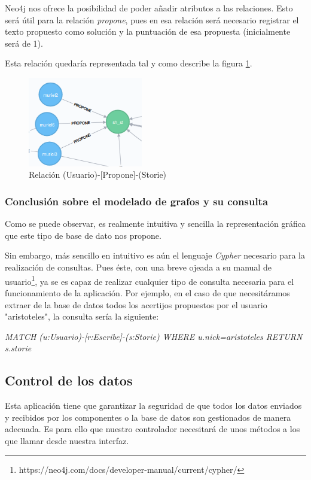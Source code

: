 Neo4j nos ofrece la posibilidad de poder añadir atributos a las relaciones. Esto será útil para la relación \textit{propone}, pues en esa relación será necesario registrar el texto propuesto como solución y la puntuación de esa propuesta (inicialmente será de 1).

Esta relación quedaría representada tal y como describe la figura \ref{fig::propone}.

\begin{figure}
     \centerline{\includegraphics[width=5cm]{figuras/propone.png}}
    \caption{Relación (Usuario)-[Propone]-(Storie)} 
    \label{fig::propone}
\end{figure}

\subsubsection{Conclusión sobre el modelado de grafos y su consulta}

Como se puede observar, es realmente intuitiva y sencilla la representación gráfica que este tipo de base de dato nos propone.

Sin embargo, más sencillo  en intuitivo es aún el lenguaje \textit{Cypher} necesario para la realización de consultas. Pues éste, con una breve ojeada a su manual de usuario\footnote{https://neo4j.com/docs/developer-manual/current/cypher/}, ya se es capaz de realizar cualquier tipo de consulta necesaria para el funcionamiento de la aplicación. Por ejemplo, en el caso de que necesitáramos extraer de la base de datos todos los acertijos propuestos por el usuario "aristoteles", la consulta sería la siguiente:

\textit{MATCH (u:Usuario)-[r:Escribe]-(s:Storie) WHERE u.nick=aristoteles RETURN s.storie}

\subsection{Control de los datos}

Esta aplicación tiene que garantizar la seguridad de que todos los datos enviados y recibidos por los componentes o la base de datos son gestionados de manera adecuada. Es para ello que nuestro controlador necesitará de unos métodos a los que llamar desde nuestra interfaz.

